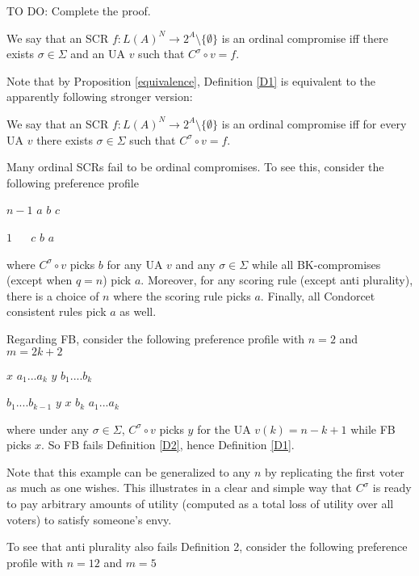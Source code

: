 \documentclass[version=3.21, pagesize, notitlepage, twoside=off, bibliography=totoc, DIV=calc, fontsize=12pt, a4paper]{scrartcl}
\begin{document}
TO DO: Complete the proof.

\begin{definition}
\label{D1} \bigskip We say that an SCR $f:L(A)^{N}\rightarrow 2^{A} \setminus \{\emptyset \}$ is an ordinal compromise iff there exists $\sigma \in \Sigma $ and an UA $v$ such that $C^{\sigma }\circ v=f$.
\end{definition}

Note that by Proposition \ref{equivalence}, Definition \ref{D1} is equivalent to the apparently following stronger version:

\begin{definition}
\label{D2} We say that an SCR $f:L(A)^{N}\rightarrow 2^{A} \setminus \{\emptyset \}$ is an ordinal compromise iff for every UA $v$ there exists $\sigma \in \Sigma $ such that $C^{\sigma }\circ v=f$.
\end{definition}

Many ordinal SCRs fail to be ordinal compromises. To see this, consider the following preference profile

$n-1$ $a$ $b$ $c$

$1$ $\ \ \ \ \ \ c$ $b$ $a$

where $C^{\sigma }\circ v$ picks $b$ for any UA $v$ and any $\sigma \in \Sigma $ while all BK-compromises (except when $q=n$) pick $a$. Moreover, for any scoring rule (except anti plurality), there is a choice of $n$ where the scoring rule picks $a$. Finally, all Condorcet consistent rules pick $a$ as well.

Regarding FB, consider the following preference profile with $n=2$ and $m=2k+2$

\bigskip

$x$ $a_{1}...a_{k}$ $y$ $b_{1}....b_{k}$

$b_{1}....b_{k-1}$ $y$ $x$ $b_{k}$ $a_{1}...a_{k}$

\bigskip

where under any $\sigma \in \Sigma $, $C^{\sigma }\circ v$ picks $y$ for the UA $v(k)=n-k+1$ while FB picks $x$. So FB fails Definition \ref{D2}, hence Definition \ref{D1}.

Note that this example can be generalized to any $n$ by replicating the first voter as much as one wishes. This illustrates in a clear and simple
way that $C^{\sigma }$ is ready to pay arbitrary amounts of utility (computed as a total loss of utility over all voters) to satisfy someone's envy.

To see that anti plurality also fails Definition 2, consider the following preference profile with $n=12$ and $m=5$
\end{document}
